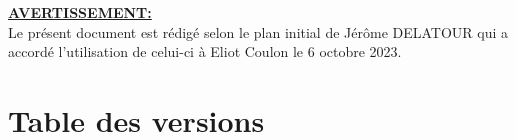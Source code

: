\documentclass[a4paper,11pt,titlepage]{article}
\author{\teamName}        %
\title{\documentName}     %
\date{\normalsize\today}    %
\begin{document}
\maketitle

\setcounter{page}{1}
\vspace*{\fill}
\noindent
\underline{\textbf{AVERTISSEMENT:}} \\
Le présent document est rédigé selon le plan initial de Jérôme DELATOUR qui a accordé l'utilisation de celui-ci à Eliot Coulon le 6 octobre 2023. \\
\vspace*{\fill}
\clearpage

\section*{Table des versions}
 \label{Table des versions} %
\clearpage

\tableofcontents %


    








\listoffigures \label{TableOfFigure} %
\end{document}
